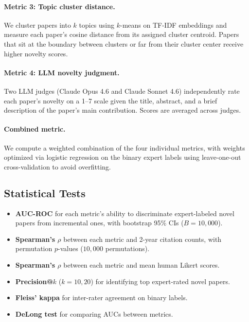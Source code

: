 \documentclass[11pt,a4paper]{article}
\begin{document}
\paragraph{Metric 3: Topic cluster distance.}
We cluster papers into $k$ topics using $k$-means on TF-IDF embeddings
and measure each paper's cosine distance from its assigned cluster
centroid.  Papers that sit at the boundary between clusters or far from
their cluster center receive higher novelty scores.

\paragraph{Metric 4: LLM novelty judgment.}
Two LLM judges (Claude Opus 4.6 and Claude Sonnet 4.6) independently
rate each paper's novelty on a 1--7 scale given the title, abstract, and
a brief description of the paper's main contribution.  Scores are
averaged across judges.

\paragraph{Combined metric.}
We compute a weighted combination of the four individual metrics, with
weights optimized via logistic regression on the binary expert labels
using leave-one-out cross-validation to avoid overfitting.

\subsection{Statistical Tests}
\label{sec:statistics}

\begin{itemize}
  \item \textbf{AUC-ROC} for each metric's ability to discriminate
        expert-labeled novel papers from incremental ones, with
        bootstrap 95\% CIs ($B = 10{,}000$).
  \item \textbf{Spearman's $\rho$} between each metric and 2-year
        citation counts, with permutation $p$-values
        ($10{,}000$ permutations).
  \item \textbf{Spearman's $\rho$} between each metric and mean
        human Likert scores.
  \item \textbf{Precision@$k$} ($k = 10, 20$) for identifying top
        expert-rated novel papers.
  \item \textbf{Fleiss' kappa} for inter-rater agreement on binary
        labels.
  \item \textbf{DeLong test} for comparing AUCs between metrics.
\end{itemize}
\end{document}
